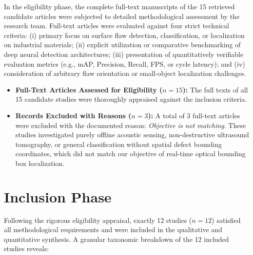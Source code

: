 In the eligibility phase, the complete full-text manuscripts of the 15 retrieved candidate articles were subjected to detailed methodological assessment by the research team. Full-text articles were evaluated against four strict technical criteria: (i) primary focus on surface flaw detection, classification, or localization on industrial materials; (ii) explicit utilization or comparative benchmarking of deep neural detection architectures; (iii) presentation of quantitatively verifiable evaluation metrics (e.g., mAP, Precision, Recall, FPS, or cycle latency); and (iv) consideration of arbitrary flaw orientation or small-object localization challenges.

\begin{itemize}
\item \textbf{Full-Text Articles Assessed for Eligibility ($n = 15$):} The full texts of all 15 candidate studies were thoroughly appraised against the inclusion criteria.
\item \textbf{Records Excluded with Reasons ($n = 3$):} A total of 3 full-text articles were excluded with the documented reason: \emph{Objective is not matching}. These studies investigated purely offline acoustic sensing, non-destructive ultrasound tomography, or general classification without spatial defect bounding coordinates, which did not match our objective of real-time optical bounding box localization.
\end{itemize}

\section{Inclusion Phase}
\label{sec:inclusion}

Following the rigorous eligibility appraisal, exactly 12 studies ($n = 12$) satisfied all methodological requirements and were included in the qualitative and quantitative synthesis. A granular taxonomic breakdown of the 12 included studies reveals:

